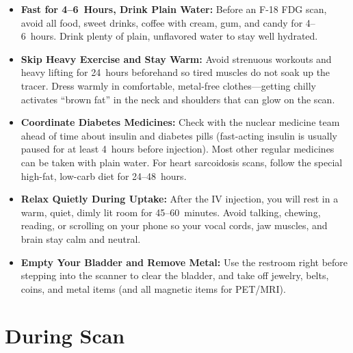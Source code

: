 \begin{itemize}
    \item \textbf{Fast for 4--6~Hours, Drink Plain Water:} Before an F-18 FDG scan, avoid all food, sweet drinks, coffee with cream, gum, and candy for 4--6~hours. Drink plenty of plain, unflavored water to stay well hydrated.
    \item \textbf{Skip Heavy Exercise and Stay Warm:} Avoid strenuous workouts and heavy lifting for 24~hours beforehand so tired muscles do not soak up the tracer. Dress warmly in comfortable, metal-free clothes---getting chilly activates ``brown fat'' in the neck and shoulders that can glow on the scan.
    \item \textbf{Coordinate Diabetes Medicines:} Check with the nuclear medicine team ahead of time about insulin and diabetes pills (fast-acting insulin is usually paused for at least 4~hours before injection). Most other regular medicines can be taken with plain water. For heart sarcoidosis scans, follow the special high-fat, low-carb diet for 24--48~hours.
    \item \textbf{Relax Quietly During Uptake:} After the IV injection, you will rest in a warm, quiet, dimly lit room for 45--60~minutes. Avoid talking, chewing, reading, or scrolling on your phone so your vocal cords, jaw muscles, and brain stay calm and neutral.
    \item \textbf{Empty Your Bladder and Remove Metal:} Use the restroom right before stepping into the scanner to clear the bladder, and take off jewelry, belts, coins, and metal items (and all magnetic items for PET/MRI).
\end{itemize}

\section{During Scan}

